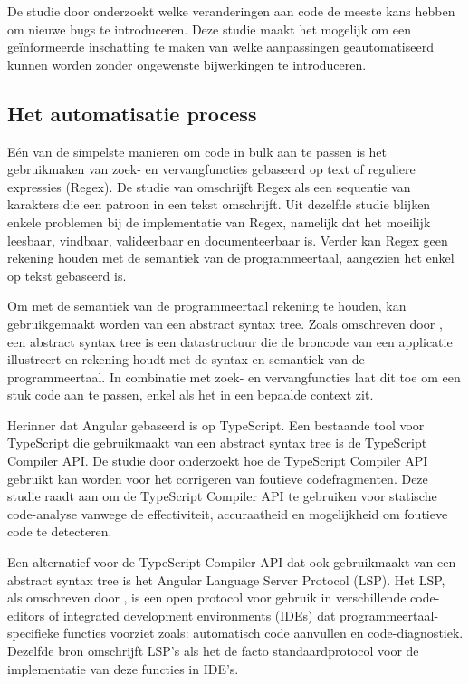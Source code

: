 De studie door \textcite{Di2020} onderzoekt welke veranderingen aan code de meeste kans hebben om nieuwe bugs te introduceren.
Deze studie maakt het mogelijk om een geïnformeerde inschatting te maken van welke aanpassingen geautomatiseerd kunnen worden zonder ongewenste bijwerkingen te introduceren.

\subsection{Het automatisatie process}

Eén van de simpelste manieren om code in bulk aan te passen is het gebruikmaken van zoek- en vervangfuncties gebaseerd op text of reguliere expressies (Regex).
De studie van \textcite{Michael2019} omschrijft Regex als een sequentie van karakters die een patroon in een tekst omschrijft.
Uit dezelfde studie blijken enkele problemen bij de implementatie van Regex, namelijk dat het moeilijk leesbaar, vindbaar, valideerbaar en documenteerbaar is.
Verder kan Regex geen rekening houden met de semantiek van de programmeertaal, aangezien het enkel op tekst gebaseerd is.

Om met de semantiek van de programmeertaal rekening te houden, kan gebruikgemaakt worden van een abstract syntax tree.
Zoals omschreven door \textcite{Sun2023}, een abstract syntax tree is een datastructuur die de broncode van een applicatie illustreert en rekening houdt met de syntax en semantiek van de programmeertaal.
In combinatie met zoek- en vervangfuncties laat dit toe om een stuk code aan te passen, enkel als het in een bepaalde context zit.

Herinner dat Angular gebaseerd is op TypeScript.
Een bestaande tool voor TypeScript die gebruikmaakt van een abstract syntax tree is de TypeScript Compiler API.
De studie door \textcite{Reid2023} onderzoekt hoe de TypeScript Compiler API gebruikt kan worden voor het corrigeren van foutieve codefragmenten. 
Deze studie raadt aan om de TypeScript Compiler API te gebruiken voor statische code-analyse vanwege de effectiviteit, accuraatheid en mogelijkheid om foutieve code te detecteren.

Een alternatief voor de TypeScript Compiler API dat ook gebruikmaakt van een abstract syntax tree is het Angular Language Server Protocol (LSP).
Het LSP, als omschreven door \textcite{Bork2023}, is een open protocol voor gebruik in verschillende code-editors of integrated development environments (IDEs) dat programmeertaal-specifieke functies voorziet zoals: automatisch code aanvullen en code-diagnostiek. 
Dezelfde bron omschrijft LSP's als het de facto standaardprotocol voor de implementatie van deze functies in IDE's.


